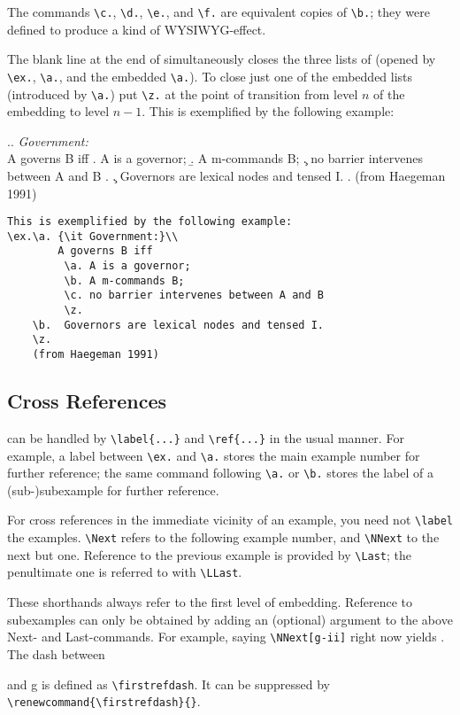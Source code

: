 \documentclass{article}
\begin{document}
The commands \verb-\c.-, \verb-\d.-, \verb-\e.-, and \verb-\f.- are 
equivalent copies of \verb-\b.-; they were defined to produce a kind 
of WYSIWYG-effect.

The blank line at the end of \Last simultaneously closes the three 
lists of \Last (opened by \verb|\ex.|, \verb|\a.|, and the embedded 
\verb|\a.|).  To close just one of the embedded lists (introduced by 
\verb|\a.|) put \verb-\z.- at the point of transition from 
level $n$ of the embedding to level $n-1$.  This is exemplified by the 
following example:

\ex.\a. {\it Government:}\\
       A governs B iff
       \a. A is a governor;
       \b. A m-commands B;
       \c. no barrier intervenes between A and B
       \z.
   \c.    Governors are lexical nodes and tensed I.
       \z.
       (from Haegeman 1991)
       
%
\begin{verbatim}
This is exemplified by the following example:
\ex.\a. {\it Government:}\\
        A governs B iff
         \a. A is a governor;
         \b. A m-commands B;
         \c. no barrier intervenes between A and B
         \z.
    \b.  Governors are lexical nodes and tensed I.
    \z.
    (from Haegeman 1991)
\end{verbatim}%
%

\subsection*{Cross References}%
can be handled by \verb-\label{...}- and \verb-\ref{...}- in the usual 
manner.  For example, a label between \verb-\ex.- and \verb-\a.- 
stores the main example number for further reference; the same command 
following \verb-\a.- or \verb-\b.- stores the label of a 
(sub-)subexample for further reference.

For cross references in the immediate vicinity of an example, you need 
not \verb|\label| the examples.  \verb-\Next- refers to the following 
example number, and \verb-\NNext- to the next but one.  Reference to 
the previous example is provided by \verb-\Last-; the penultimate one 
is referred to with \verb-\LLast-.

These shorthands always refer to the first level of embedding.  
Reference to subexamples can only be obtained by adding an (optional) argument 
to the above Next- and Last-commands.  For example, saying 
\verb.\NNext[g-ii].  right now yields \NNext[g-ii].  The dash between 
\addtocounter{ExNo}{2}\addtocounter{ExNo}{-2} and g is 
defined as \verb|\firstrefdash|.  It can be suppressed by 
\verb|\renewcommand{\firstrefdash}{}|.
\end{document}
